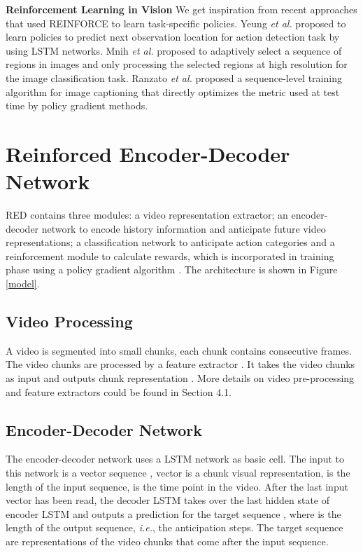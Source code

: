 \documentclass{bmvc2k}
\begin{document}
\textbf{Reinforcement Learning in Vision}
We get inspiration from recent approaches that used REINFORCE \cite{williams1992simple} to learn task-specific policies. Yeung \emph{et al.} \cite{Yeung_2016_CVPR} proposed to learn policies to predict next observation location for action detection task by using LSTM networks. Mnih \emph{et al.} \cite{mnih2014recurrent} proposed to adaptively select a sequence of regions in images and only processing the selected regions at high resolution for the image classification task. Ranzato \emph{et al.} \cite{ranzato2015sequence} proposed a sequence-level training algorithm for image captioning that directly optimizes the metric used at test time by policy gradient methods.


\section{Reinforced Encoder-Decoder Network}
RED contains three modules: a video representation extractor; an encoder-decoder network to encode history information and anticipate future video representations; a classification network to anticipate action categories and a reinforcement module to calculate rewards, which is incorporated in training phase using a policy gradient algorithm \cite{williams1992simple}. The architecture is shown in Figure \ref{model}.




\subsection{Video Processing}
A video is segmented into small chunks, each chunk contains  consecutive frames. The video chunks are processed by a feature extractor . It takes the video chunks  as input and outputs chunk representation . More details on video pre-processing and feature extractors could be found in Section 4.1.



\subsection{Encoder-Decoder Network}
The encoder-decoder network uses a LSTM network as basic cell. The input to this network is a vector sequence , vector  is a chunk visual representation,  is the length of the input sequence,  is the time point in the video. After the last input vector has been read, the decoder LSTM takes over the last hidden state of encoder LSTM and outputs a prediction for the target sequence , where  is the length of the output sequence, \emph{i.e.}, the anticipation steps. The target sequence are representations of the video chunks that come after the input sequence.
\end{document}
